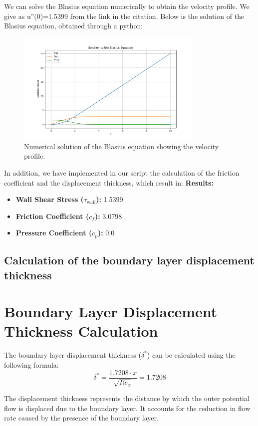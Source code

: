 \documentclass{article}
\begin{document}
We can solve the Blasius equation numerically to obtain the velocity profile. We give as u''(0)=1.5399 from the link in the \cite{NumericalMethods} citation.
Below is the solution of the Blasius equation, obtained through a python:
\begin{figure}[h]
    \centering
    \includegraphics[width=0.8\textwidth]{output_plot.png}
    \caption{Numerical solution of the Blasius equation showing the velocity profile.}
    \label{fig:blasius_solution}
\end{figure}

In addition, we have implemented in our script the calculation of the friction coefficient and the displacement thickness, which result in:
\textbf{Results:}
\begin{itemize}
    \item \textbf{Wall Shear Stress (\(\tau_{\text{wall}}\)):} 1.5399
    \item \textbf{Friction Coefficient (\(c_f\)):} 3.0798
    \item \textbf{Pressure Coefficient (\(c_p\)):} 0.0
\end{itemize}

\subsection{Calculation of the boundary layer displacement thickness}
\section*{Boundary Layer Displacement Thickness Calculation}
The boundary layer displacement thickness (\(\delta^*\)) can be calculated using the following formula:
\[
\delta^* = \frac{1.7208 \cdot x}{\sqrt{Re_x}} = 1.7208
\]

The displacement thickness represents the distance by which the outer potential flow is displaced due to the boundary layer. It accounts for the reduction in flow rate caused by the presence of the boundary layer.
\end{document}

